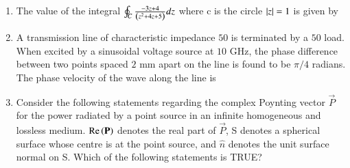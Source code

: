 \documentclass[a4paper, 11pt]{article}
\begin{document}
\begin{enumerate}
    \begin{enumerate}
    \end{enumerate}

    \hfill{}

    \item The value of the integral $\oint_{C}\frac{-3z+4}{\left(z^{2}+4z+5\right)}dz$ where c is the circle $\left\vert z\right\vert=1$ is given by
    
    \begin{enumerate}
    \end{enumerate}

    \hfill{}

    \item A transmission line of characteristic impedance $50$ \ohm is terminated by a $50$ \ohm load. When excited by a sinusoidal voltage source at $10$ GHz, the phase difference between two points spaced $2$ mm apart on the line is found to be $\pi/4$ radians. The phase velocity of the wave along the line is
    
    \begin{enumerate}
    \end{enumerate}

    \hfill{}

    \item Consider the following statements regarding the complex Poynting vector $\vec{P}$ for the power radiated by a point source in an infinite homogeneous and lossless medium. $\text{Re}\left(\mathbf{P}\right)$ denotes the real part of $\vec{P}$, S denotes a spherical surface whose centre is at the point source, and $\hat{n}$ denotes the unit surface normal on S. Which of the following statements is TRUE?
    

\end{enumerate}
\end{document}
